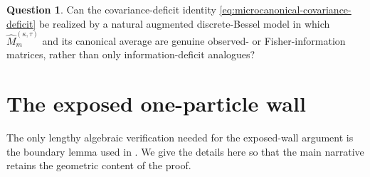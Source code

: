 \documentclass[11pt,a4paper]{amsart}
\numberwithin{equation}{section}
\theoremstyle{plain}
\theoremstyle{definition}
\newtheorem{question}[theorem]{Question}
\begin{document}
\begin{question}\label{q:bessel-statistics}
Can the covariance-deficit identity
\eqref{eq:microcanonical-covariance-deficit} be realized by a natural
augmented discrete-Bessel model in which \(\widehat M_m^{(\kappa,\tau)}\) and
its canonical average are genuine observed- or Fisher-information matrices,
rather than only information-deficit analogues?
\end{question}

\appendix

\section{The exposed one-particle wall}\label{app:boundary-proof}

The only lengthy algebraic verification needed for the exposed-wall argument is
the boundary lemma used in .  We give the details here so that
the main narrative retains the geometric content of the proof.
\end{document}
